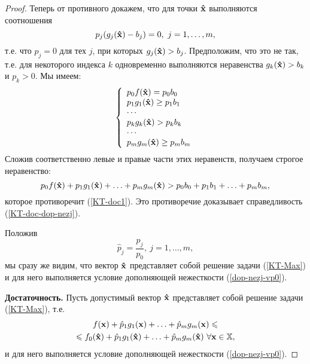 \begin{proof}
    Теперь от противного докажем, что для точки $\mathbf{\hat x}$
    выполняются соотношения
\begin{equation} \label{KT-doc-dop-nezj}
    p_{j}(g_{j}(\mathbf{\hat{x}})-b_{j})=0, \ j=1,\ldots,m,
\end{equation}
    т.е. что $p_{j}=0$ для тех $j$, при которых
    $g_{j}(\mathbf{\hat{x}})>b_{j}$.
    Предположим, что это не так, т.е.
    для некоторого индекса $k$ одновременно выполняются неравенства
    $g_k(\mathbf{\hat{x}}) > b_k$ и $p_k >0$. Мы имеем:
\[
\left\{ \begin{array}{l}
 p_0 f(\mathbf{\hat x}) = p_0 b_0\\
 p_1 g_1(\mathbf{\hat x}) \geq p_1 b_1 \\
  \cdots  \\
 p_k g_k(\mathbf{\hat x}) > p_k b_k \\
  \cdots  \\
 p_m g_m(\mathbf{\hat x}) \geq p_m b_m \\
  \end{array} \right.
\]
Сложив соответственно левые и правые части этих неравенств, получаем
строгое неравенство:
\[ p_0 f(\mathbf{\hat x}) + p_1 g_1(\mathbf{\hat x}) + \ldots + p_m g_m(\mathbf{\hat x}) >
p_0 b_0 + p_1 b_1 + \ldots + p_m b_m,
\]
 которое противоречит (\ref{KT-doc1}). Это противоречие
 доказывает справедливость (\ref{KT-doc-dop-nezj}).





    Положив
\[
    \hat p_j=\frac{p_j}{p_0}, \ j=1,\ldots,m,
\]
    мы сразу же видим, что вектор $\mathbf{\hat x}$ представляет собой решение
    задачи (\ref{KT-Max}) и для него выполняется условие дополняющей нежесткости
    (\ref{dop-nezj-vp0}).

    \textbf{Достаточность.}
    Пусть допустимый вектор $\mathbf{\hat x}$ представляет собой решение
    задачи (\ref{KT-Max}), т.е.
\begin{multline}\label{KT-Max-2}
    f(\mathbf{x}) + \hat{p}_1 g_1(\mathbf{x})+ \ldots + \hat{p}_m g_m(\mathbf{x})
    \leqslant \\
    \leqslant f_0(\mathbf{\hat{x}}) + \hat{p}_1 g_1(\mathbf{\hat{x}})+ \ldots
    + \hat{p}_m g_m(\mathbf{\hat{x}})
 \ \forall\mathbf{x} \in \mathbb{X},
\end{multline}
и для него выполняется условие дополняющей нежесткости
    (\ref{dop-nezj-vp0}).


\end{proof}
